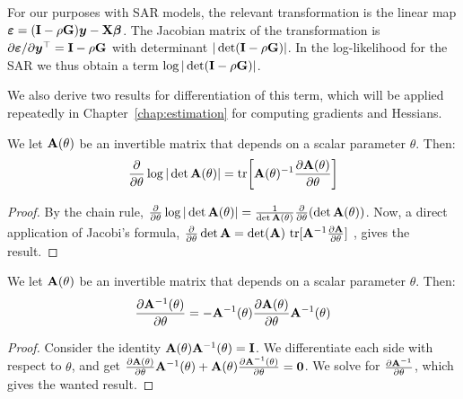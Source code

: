 For our purposes with SAR models, the relevant transformation is the linear map $\bm{\varepsilon} = (\mathbf{I} - \rho\mathbf{G})\bm{y} - \mathbf{X}\bm{\beta}$. The Jacobian matrix of the transformation is $\partial\bm{\varepsilon}/\partial\bm{y}^\top = \mathbf{I} - \rho\mathbf{G}$ with determinant $|\det(\mathbf{I} - \rho\mathbf{G})|$. In the log-likelihood for the SAR we thus obtain a term $\log|\det(\mathbf{I} - \rho\mathbf{G})|$.

We also derive two results for differentiation of this term, which will be applied repeatedly in Chapter~\ref{chap:estimation} for computing gradients and Hessians.

\begin{lemma}
\label{lem:logdet_deriv}
We let $\mathbf{A}(\theta)$ be an invertible matrix that depends on a scalar parameter $\theta$. Then:
\begin{equation}
\label{eq:logdet_deriv}
    \frac{\partial}{\partial \theta} \log|\det \mathbf{A}(\theta)| = \operatorname{tr}\!\left[\mathbf{A}(\theta)^{-1} \frac{\partial \mathbf{A}(\theta)}{\partial \theta}\right]
\end{equation}
\end{lemma}

\begin{proof}
By the chain rule, $\frac{\partial}{\partial \theta} \log|\det\mathbf{A}(\theta)| = \frac{1}{\det \mathbf{A}(\theta)}\frac{\partial}{\partial \theta} (\det\mathbf{A}(\theta))$. Now, a direct application of Jacobi's formula, $\frac{\partial}{\partial \theta}\det\mathbf{A} = \det(\mathbf{A})\,\operatorname{tr}[\mathbf{A}^{-1} \frac{\partial \mathbf{A}}{\partial \theta}]$ \parencite[Eq.~(46), p.~8]{PetersenPedersen2012}, gives the result.
\end{proof}

\begin{lemma}
\label{lem:matinv_deriv}
We let $\mathbf{A}(\theta)$ be an invertible matrix that depends on a scalar parameter $\theta$. Then:
\begin{equation}
\label{eq:matinv_deriv}
    \frac{\partial \mathbf{A}^{-1}(\theta)}{\partial \theta} = -\mathbf{A}^{-1}(\theta)\frac{\partial \mathbf{A}(\theta)}{\partial \theta}\mathbf{A}^{-1}(\theta)
\end{equation}
\end{lemma}

\begin{proof}
Consider the identity $\mathbf{A}(\theta)\mathbf{A}^{-1}(\theta) = \mathbf{I}$. We differentiate each side with respect to $\theta$, and get $\frac{\partial \mathbf{A}(\theta)}{\partial \theta}\mathbf{A}^{-1}(\theta) + \mathbf{A}(\theta)\frac{\partial \mathbf{A}^{-1}(\theta)}{\partial \theta} = \mathbf{0}$. We solve for $\frac{\partial \mathbf{A}^{-1}}{\partial \theta}$, which gives the wanted result.
\end{proof}

